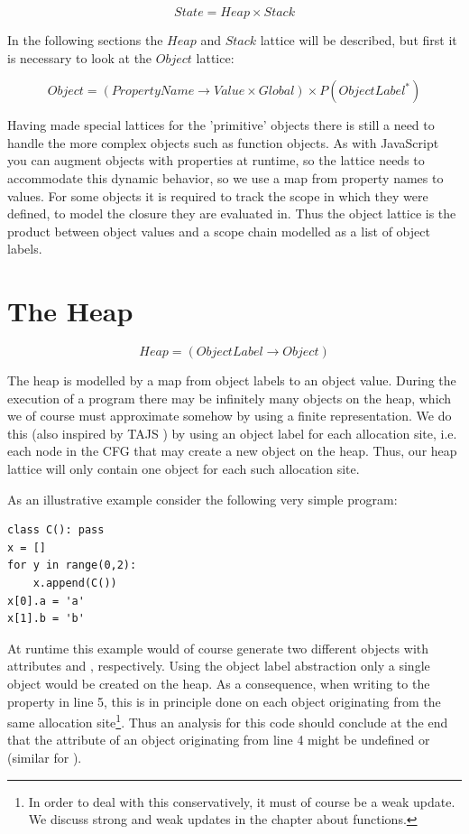 \begin{equation*}
State = Heap \times Stack
\end{equation*}

In the following sections the $Heap$ and $Stack$ lattice will be described, but first it is necessary to look at the $Object$ lattice:

\begin{equation*}
Object = (PropertyName \rightarrow Value \times Global) \times P(ObjectLabel^{*})
\end{equation*}

Having made special lattices for the 'primitive' objects there is still a need to handle the more complex objects such as function objects. As with JavaScript you can augment objects with properties at runtime, so the lattice needs to accommodate this dynamic behavior, so we use a map from property names to values. For some objects it is required to track the scope in which they were defined, to model the closure they are evaluated in. Thus the object lattice is the product between object values and a scope chain modelled as a list of object labels.


\section{The Heap}
\label{The Heap}
\begin{equation*}
Heap = (ObjectLabel \rightarrow Object)
\end{equation*}

The heap is modelled by a map from object labels to an object value. During the execution of a program there may be infinitely many objects on the heap, which we of course must approximate somehow by using a finite representation. We do this (also inspired by TAJS \cite{tajs}) by using an object label for each allocation site, i.e. each node in the CFG that may create a new object on the heap. Thus, our heap lattice will only contain one object for each such allocation site.

As an illustrative example consider the following very simple program:

\begin{listing}[H]
	\begin{verbatim}
class C(): pass
x = []
for y in range(0,2):
	x.append(C())
x[0].a = 'a'
x[1].b = 'b'
	\end{verbatim}
\end{listing}

At runtime this example would of course generate two different  objects with attributes  and , respectively. Using the object label abstraction only a single  object would be created on the heap. As a consequence, when writing to the property  in line 5, this is in principle done on each object originating from the same allocation site\footnote{In order to deal with this conservatively, it must of course be a weak update. We discuss strong and weak updates in the chapter about functions.}. Thus an analysis for this code should conclude at the end that the attribute  of an object originating from line 4 might be undefined or  (similar for ).

